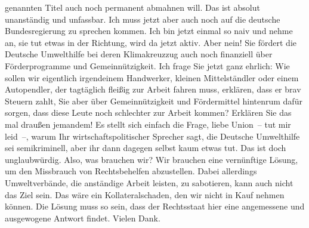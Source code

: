 \documentclass{article}
\begin{document}
genannten Titel auch noch permanent abmahnen will. Das ist absolut unanständig und unfassbar.  Ich muss jetzt aber auch noch auf die deutsche Bundesregierung zu sprechen kommen. Ich bin jetzt einmal so naiv und nehme an, sie tut etwas in der Richtung, wird da jetzt aktiv. Aber nein! Sie fördert die Deutsche Umwelthilfe bei deren Klimakreuzzug auch noch finanziell über Förderprogramme und Gemeinnützigkeit. Ich frage Sie jetzt ganz ehrlich: Wie sollen wir eigentlich irgendeinem Handwerker, kleinen Mittelständler oder einem Autopendler, der tagtäglich fleißig zur Arbeit fahren muss, erklären, dass er brav Steuern zahlt, Sie aber über Gemeinnützigkeit und Fördermittel hintenrum dafür sorgen, dass diese Leute noch schlechter zur Arbeit kommen? Erklären Sie das mal draußen jemandem!  Es stellt sich einfach die Frage, liebe Union – tut mir leid –, warum Ihr wirtschaftspolitischer Sprecher sagt, die Deutsche Umwelthilfe sei semikriminell, aber ihr dann dagegen selbst kaum etwas tut. Das ist doch unglaubwürdig. Also, was brauchen wir? Wir brauchen eine vernünftige Lösung, um den Missbrauch von Rechtsbehelfen abzustellen. Dabei allerdings Umweltverbände, die anständige Arbeit leisten, zu sabotieren, kann auch nicht das Ziel sein. Das wäre ein Kollateralschaden, den wir nicht in Kauf nehmen können. Die Lösung muss so sein, dass der Rechtsstaat hier eine angemessene und ausgewogene Antwort findet. Vielen Dank.  
\end{document}
